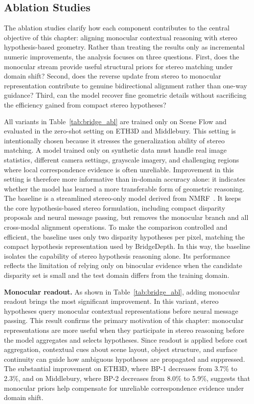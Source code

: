 \subsection{Ablation Studies}
The ablation studies clarify how each component contributes to the central objective of this chapter: aligning monocular contextual reasoning with stereo hypothesis-based geometry.
Rather than treating the results only as incremental numeric improvements, the analysis focuses on three questions.
First, does the monocular stream provide useful structural priors for stereo matching under domain shift?
Second, does the reverse update from stereo to monocular representation contribute to genuine bidirectional alignment rather than one-way guidance?
Third, can the model recover fine geometric details without sacrificing the efficiency gained from compact stereo hypotheses?

All variants in Table~\ref{tab:bridge_abl} are trained only on Scene Flow and evaluated in the zero-shot setting on ETH3D and Middlebury.
This setting is intentionally chosen because it stresses the generalization ability of stereo matching.
A model trained only on synthetic data must handle real image statistics, different camera settings, grayscale imagery, and challenging regions where local correspondence evidence is often unreliable.
Improvement in this setting is therefore more informative than in-domain accuracy alone: it indicates whether the model has learned a more transferable form of geometric reasoning.
The baseline is a streamlined stereo-only model derived from NMRF~\cite{guan2024neural}.
It keeps the core hypothesis-based stereo formulation, including compact disparity proposals and neural message passing, but removes the monocular branch and all cross-modal alignment operations.
To make the comparison controlled and efficient, the baseline uses only two disparity hypotheses per pixel, matching the compact hypothesis representation used by BridgeDepth.
In this way, the baseline isolates the capability of stereo hypothesis reasoning alone.
Its performance reflects the limitation of relying only on binocular evidence when the candidate disparity set is small and the test domain differs from the training domain.

\noindent\textbf{Monocular readout.} As shown in Table~\ref{tab:bridge_abl}, adding monocular readout brings the most significant improvement.
In this variant, stereo hypotheses query monocular contextual representations before neural message passing.
This result confirms the primary motivation of this chapter: monocular representations are more useful when they participate in stereo reasoning before the model aggregates and selects hypotheses.
Since readout is applied before cost aggregation, contextual cues about scene layout, object structure, and surface continuity can guide how ambiguous hypotheses are propagated and suppressed.
The substantial improvement on ETH3D, where BP-1 decreases from 3.7\% to 2.3\%, and on Middlebury, where BP-2 decreases from 8.0\% to 5.9\%, suggests that monocular priors help compensate for unreliable correspondence evidence under domain shift.

